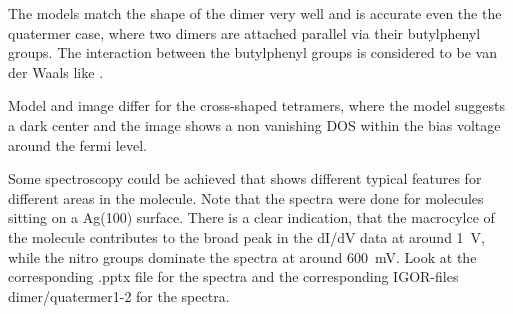 

% 


The models match the shape of the dimer very well and is accurate even the the quatermer case, where two dimers are attached parallel via their butylphenyl groups. The interaction between the butylphenyl groups is considered to be van der Waals like \cite{iacovita_controlling_2012}.

Model and image differ for the cross-shaped tetramers, where the model suggests a dark center and the image shows a non vanishing DOS within the bias voltage around the fermi level.

Some spectroscopy could be achieved that shows different typical features for different areas in the molecule. Note that the spectra were done for molecules sitting on a Ag(100) surface.
There is a clear indication, that the macrocylce of the molecule contributes to the broad peak in the dI/dV data at around \SI{1}{\V}, while the nitro groups dominate the spectra at around \SI{600}{\milli \V}. 
Look at the corresponding .pptx file for the spectra and the corresponding IGOR-files dimer/quatermer1-2 for the spectra.

